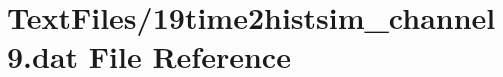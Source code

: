 \hypertarget{19time2histsim__channel9_8dat}{}\section{Text\+Files/19time2histsim\+\_\+channel9.dat File Reference}
\label{19time2histsim__channel9_8dat}
